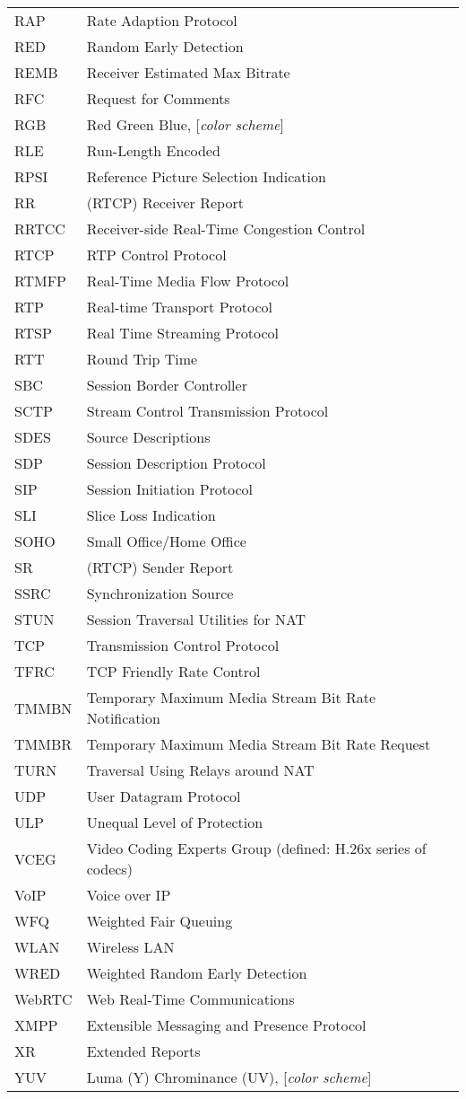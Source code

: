 \begin{longtable}{ll}
RAP 	& Rate Adaption Protocol \\
RED 	& Random Early Detection \\
REMB 	& Receiver Estimated Max Bitrate \\
RFC 	& Request for Comments \\
RGB 	& Red Green Blue, [\textit{color scheme}] \\
RLE  	& Run-Length Encoded \\
RPSI 	& Reference Picture Selection Indication \\
RR  	& (RTCP) Receiver Report \\
RRTCC	& Receiver-side Real-Time Congestion Control \\
RTCP 	& RTP Control Protocol \\
RTMFP	& Real-Time Media Flow Protocol \\
RTP 	& Real-time Transport Protocol \\
RTSP 	& Real Time Streaming Protocol \\
RTT 	& Round Trip Time \\
SBC  	& Session Border Controller \\
SCTP 	& Stream Control Transmission Protocol \\
SDES	& Source Descriptions \\
SDP 	& Session Description Protocol \\
SIP 	& Session Initiation Protocol \\
SLI 	& Slice Loss Indication \\
SOHO 	& Small Office/Home Office \\
SR  	& (RTCP) Sender Report \\
SSRC	& Synchronization Source \\
STUN  	& Session Traversal Utilities for NAT \\
TCP 	& Transmission Control Protocol \\
TFRC 	& TCP Friendly Rate Control \\
TMMBN 	& Temporary Maximum Media Stream Bit Rate Notification \\
TMMBR 	& Temporary Maximum Media Stream Bit Rate Request \\
TURN  	& Traversal Using Relays around NAT \\
UDP 	& User Datagram Protocol \\
ULP 	& Unequal Level of Protection \\
VCEG 	& Video Coding Experts Group (defined: H.26x series of codecs)\\
VoIP 	& Voice over IP \\
WFQ 	& Weighted Fair Queuing \\
WLAN	& Wireless LAN \\
WRED 	& Weighted Random Early Detection \\
WebRTC	& Web Real-Time Communications \\
XMPP 	& Extensible Messaging and Presence Protocol \\
XR  	& Extended Reports \\
YUV 	& Luma (Y) Chrominance (UV), [\textit{color scheme}] \\
\end{longtable}
